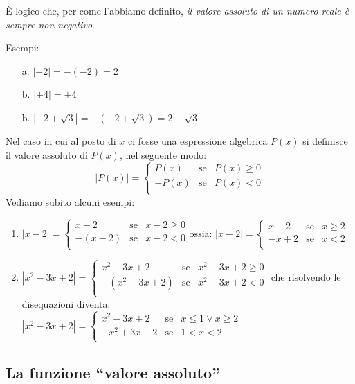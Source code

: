 È logico che, per come l'abbiamo definito,\textit{ il valore assoluto di un 
numero reale è sempre non negativo}.

Esempi:
\begin{enumerate}
\item[a.]
$|-2|=-(-2)=2$
\item[b.]
$|+4|=+4$
\item[b.]
$|-2+\sqrt{3}|=-(-2+\sqrt{3})=2-\sqrt{3}$
\end{enumerate} 
Nel caso in cui al posto di $x$ ci fosse una espressione algebrica  $P(x)$ si 
definisce il valore assoluto di $P(x)$, nel seguente modo:
$$|P(x)|=\left\lbrace 
\begin{array}{lcl}
P(x) & \text{se} & P(x)\geq 0 \\
-P(x) & \text{se} & P(x)< 0 \\
\end{array}
\right. 
$$
Vediamo subito alcuni esempi:
\begin{enumerate}
\item
$|x-2|=\left\lbrace 
\begin{array}{lcl}
x-2 & \text{se} & x-2\geq 0 \\
-(x-2) & \text{se} & x-2< 0 \\
\end{array}
\right.
\text{ossia: }
|x-2|=\left\lbrace 
\begin{array}{lcl}
x-2 & \text{se} & x\geq 2 \\
-x+2 & \text{se} & x<2 \\
\end{array}
\right.
$
\item
$|x^2-3x+2|=\left\lbrace 
\begin{array}{lcl}
x^2-3x+2 & \text{se} & x^2-3x+2\geq 0 \\
-(x^2-3x+2) & \text{se} & x^2-3x+2< 0 \\
\end{array}
\right.$
che risolvendo le disequazioni diventa:\\
$
|x^2-3x+2|=\left\lbrace 
\begin{array}{lcl}
x^2-3x+2 & \text{se} & x\leq 1 \vee x\geq 2 \\
-x^2+3x-2 & \text{se} & 1<x<2 \\
\end{array}
\right.
$
\end{enumerate}

\subsection{La funzione ``valore assoluto''}

